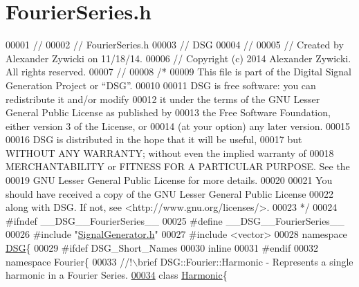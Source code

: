 \hypertarget{_fourier_series_8h_source}{\section{Fourier\+Series.\+h}
\label{_fourier_series_8h_source}
}

\begin{DoxyCode}
00001 \textcolor{comment}{//}
00002 \textcolor{comment}{//  FourierSeries.h}
00003 \textcolor{comment}{//  DSG}
00004 \textcolor{comment}{//}
00005 \textcolor{comment}{//  Created by Alexander Zywicki on 11/18/14.}
00006 \textcolor{comment}{//  Copyright (c) 2014 Alexander Zywicki. All rights reserved.}
00007 \textcolor{comment}{//}
00008 \textcolor{comment}{/*}
00009 \textcolor{comment}{ This file is part of the Digital Signal Generation Project or “DSG”.}
00010 \textcolor{comment}{}
00011 \textcolor{comment}{ DSG is free software: you can redistribute it and/or modify}
00012 \textcolor{comment}{ it under the terms of the GNU Lesser General Public License as published by}
00013 \textcolor{comment}{ the Free Software Foundation, either version 3 of the License, or}
00014 \textcolor{comment}{ (at your option) any later version.}
00015 \textcolor{comment}{}
00016 \textcolor{comment}{ DSG is distributed in the hope that it will be useful,}
00017 \textcolor{comment}{ but WITHOUT ANY WARRANTY; without even the implied warranty of}
00018 \textcolor{comment}{ MERCHANTABILITY or FITNESS FOR A PARTICULAR PURPOSE.  See the}
00019 \textcolor{comment}{ GNU Lesser General Public License for more details.}
00020 \textcolor{comment}{}
00021 \textcolor{comment}{ You should have received a copy of the GNU Lesser General Public License}
00022 \textcolor{comment}{ along with DSG.  If not, see <http://www.gnu.org/licenses/>.}
00023 \textcolor{comment}{ */}
00024 \textcolor{preprocessor}{#ifndef \_\_DSG\_\_FourierSeries\_\_}
00025 \textcolor{preprocessor}{#define \_\_DSG\_\_FourierSeries\_\_}
00026 \textcolor{preprocessor}{#include "\hyperlink{_signal_generator_8h}{SignalGenerator.h}"}
00027 \textcolor{preprocessor}{#include <vector>}
00028 \textcolor{keyword}{namespace }\hyperlink{namespace_d_s_g}{DSG}\{
00029 \textcolor{preprocessor}{#ifdef DSG\_Short\_Names}
00030     \textcolor{keyword}{inline}
00031 \textcolor{preprocessor}{#endif}
00032     \textcolor{keyword}{namespace }Fourier\{\textcolor{comment}{}
00033 \textcolor{comment}{        //!\(\backslash\)brief DSG::Fourier::Harmonic - Represents a single harmonic in a Fourier Series.}
\hypertarget{_fourier_series_8h_source_l00034}{}\hyperlink{class_d_s_g_1_1_fourier_1_1_harmonic}{00034} \textcolor{comment}{}        \textcolor{keyword}{class }\hyperlink{class_d_s_g_1_1_fourier_1_1_harmonic}{Harmonic}\{

\end{DoxyCode}
